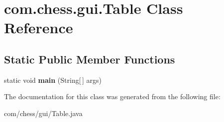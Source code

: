 \hypertarget{classcom_1_1chess_1_1gui_1_1_table}{}\section{com.\+chess.\+gui.\+Table Class Reference}
\label{classcom_1_1chess_1_1gui_1_1_table}
\subsection*{Static Public Member Functions}
\begin{DoxyCompactItemize}
\item 
\mbox{\label{classcom_1_1chess_1_1gui_1_1_table_a4c1efba82bcbeff0bf8b34742a05b5ad}} 
static void {\bfseries main} (String\mbox{[}$\,$\mbox{]} args)
\end{DoxyCompactItemize}


The documentation for this class was generated from the following file\+:\begin{DoxyCompactItemize}
\item 
com/chess/gui/Table.\+java\end{DoxyCompactItemize}

